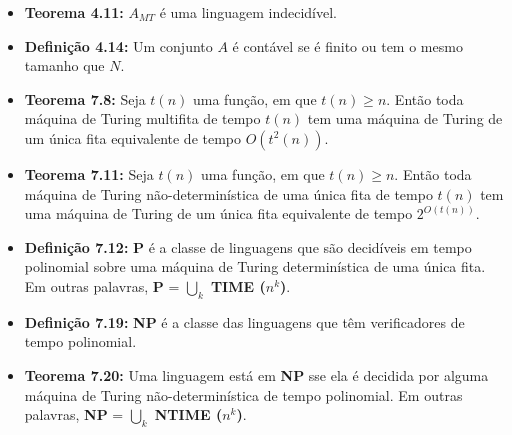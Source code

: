 \documentclass[12pt,a4paper,oneside]{article}
\begin{document}
\begin{itemize}
	\item[] {\bf Teorema 4.11:} $A_{MT}$ é uma linguagem indecidível.
	\item[] {\bf Definição 4.14:} Um conjunto $A$ é contável se é finito ou tem o mesmo tamanho que $N$.
	\item[] {\bf Teorema 7.8: }
	Seja $t(n)$ uma função, em que $t(n) \geq n$. Então toda máquina de Turing multifita de tempo $t(n)$ tem uma máquina de Turing de um única fita equivalente de tempo $O(t^2(n))$.
	\item[] {\bf Teorema 7.11: }
	Seja $t(n)$ uma função, em que $t(n) \geq n$. Então toda máquina de Turing não-determinística de uma única fita de tempo $t(n)$ tem uma máquina de Turing de um única fita equivalente de tempo $2^{O(t(n))}$.	
	\item[] {\bf Definição 7.12: }
	{\bf P} é a classe de linguagens que são decidíveis em tempo polinomial sobre uma máquina de Turing determinística de uma única fita. Em outras palavras, {\bf P} = $\bigcup\limits_{k}$ {\bf TIME ($n^k$)}.
	\item[] {\bf Definição 7.19: }
	{\bf NP} é a classe das linguagens que têm verificadores de tempo polinomial.
	\item[] {\bf Teorema 7.20: }
	Uma linguagem está em {\bf NP} sse ela é decidida por alguma máquina de Turing não-determinística de tempo polinomial.  Em outras palavras, {\bf NP} = $\bigcup\limits_{k}$ {\bf NTIME ($n^k$)}.
\end{itemize}
\end{document}

